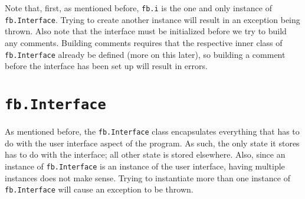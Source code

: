 \documentclass[letterpaper,12pt]{article}
\newcommand{\fb}[1]{\texttt{fb#1}}
\begin{document}
Note that, first, as mentioned before, \fb{.i} is the one and only instance of \fb{.Interface}.  Trying to create another instance will result in an exception being thrown.  Also note that the interface must be initialized before we try to build any comments.  Building comments requires that the respective inner class of \fb{.Interface} already be defined (more on this later), so building a comment before the interface has been set up will result in errors.

\section{\texorpdfstring{\fb{.Interface}}{fb.Interface}}
\label{sec:fb.Interface}
As mentioned before, the \fb{.Interface} class encapsulates everything that has to do with the user interface aspect of the program.  As such, the only state it stores has to do with the interface; all other state is stored elsewhere.  Also, since an instance of \fb{.Interface} is an instance of the user interface, having multiple instances does not make sense.  Trying to instantiate more than one instance of \fb{.Interface} will cause an exception to be thrown.
\end{document}
